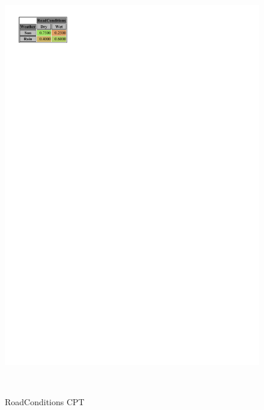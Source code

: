 \documentclass[a4paper,12pt]{article} %
\begin{document}
\begin{figure}[htb]
\begin{minipage}[c]{.45\textwidth}
		\includegraphics[width=\linewidth]{../code/roadconditions.pdf}	
		\caption{RoadConditions CPT}
		\label{fig:roadconditions}
	\end{minipage}
\\
	\centering
	\begin{minipage}[c]{.5\textwidth}
		\centering
		

\end{minipage}
\end{figure}
\end{document}
